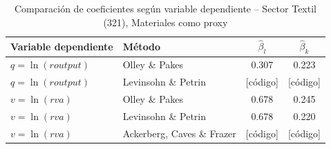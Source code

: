 \begin{table}[H]
\centering
\caption{Comparación de coeficientes según variable dependiente -- Sector Textil (321), Materiales como proxy}
\begin{tabular}{llcc}
\toprule
Variable dependiente & Método & $\hat{\beta}_l$ & $\hat{\beta}_k$ \\
\midrule
$q = \ln(\mathit{routput})$ & Olley \& Pakes    & 0.307 & 0.223 \\
$q = \ln(\mathit{routput})$ & Levinsohn \& Petrin & [código] & [código] \\
\midrule
$v = \ln(\mathit{rva})$     & Olley \& Pakes    & 0.678 & 0.245 \\
$v = \ln(\mathit{rva})$     & Levinsohn \& Petrin & 0.678 & 0.220 \\
$v = \ln(\mathit{rva})$     & Ackerberg, Caves \& Frazer & [código] & [código] \\
\bottomrule
\end{tabular}
\end{table}
